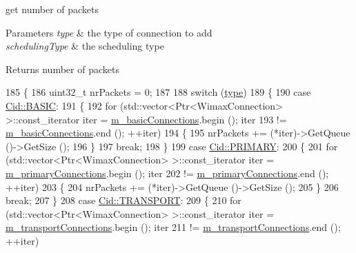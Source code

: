 get number of packets 


\begin{DoxyParams}{Parameters}
{\em type} & the type of connection to add \\
\hline
{\em scheduling\+Type} & the scheduling type \\
\hline
\end{DoxyParams}
\begin{DoxyReturn}{Returns}
number of packets 
\end{DoxyReturn}

\begin{DoxyCode}
185 \{
186   uint32\_t nrPackets = 0;
187 
188   \textcolor{keywordflow}{switch} (\hyperlink{visualizer-ideas_8txt_add98db9e15e2a58cf2b57623e7aa893a}{type})
189     \{
190     \textcolor{keywordflow}{case} \hyperlink{classns3_1_1Cid_a10b8f92080ca5790e65a0bfa2f557e0aa68b82b5b38abe3f2b40e5e3d950ac746}{Cid::BASIC}:
191       \{
192         \textcolor{keywordflow}{for} (std::vector<Ptr<WimaxConnection> >::const\_iterator iter = 
      \hyperlink{classns3_1_1ConnectionManager_a0f81554a9cd0f8c0de8502934a183a4f}{m\_basicConnections}.begin (); iter
193              != \hyperlink{classns3_1_1ConnectionManager_a0f81554a9cd0f8c0de8502934a183a4f}{m\_basicConnections}.end (); ++iter)
194           \{
195             nrPackets += (*iter)->GetQueue ()->GetSize ();
196           \}
197         \textcolor{keywordflow}{break};
198       \}
199     \textcolor{keywordflow}{case} \hyperlink{classns3_1_1Cid_a10b8f92080ca5790e65a0bfa2f557e0aa0ffb28b79686aa37c614c868e330418b}{Cid::PRIMARY}:
200       \{
201         \textcolor{keywordflow}{for} (std::vector<Ptr<WimaxConnection> >::const\_iterator iter = 
      \hyperlink{classns3_1_1ConnectionManager_a0cb92894d44165904581b248f7da763c}{m\_primaryConnections}.begin (); iter
202              != \hyperlink{classns3_1_1ConnectionManager_a0cb92894d44165904581b248f7da763c}{m\_primaryConnections}.end (); ++iter)
203           \{
204             nrPackets += (*iter)->GetQueue ()->GetSize ();
205           \}
206         \textcolor{keywordflow}{break};
207       \}
208     \textcolor{keywordflow}{case} \hyperlink{classns3_1_1Cid_a10b8f92080ca5790e65a0bfa2f557e0aa46fbed56841c3bf471aa84de022edf87}{Cid::TRANSPORT}:
209       \{
210         \textcolor{keywordflow}{for} (std::vector<Ptr<WimaxConnection> >::const\_iterator iter = 
      \hyperlink{classns3_1_1ConnectionManager_a78fdb78f7e511846b77f18a9b3959f71}{m\_transportConnections}.begin (); iter
211              != \hyperlink{classns3_1_1ConnectionManager_a78fdb78f7e511846b77f18a9b3959f71}{m\_transportConnections}.end (); ++iter)

\end{DoxyCode}
